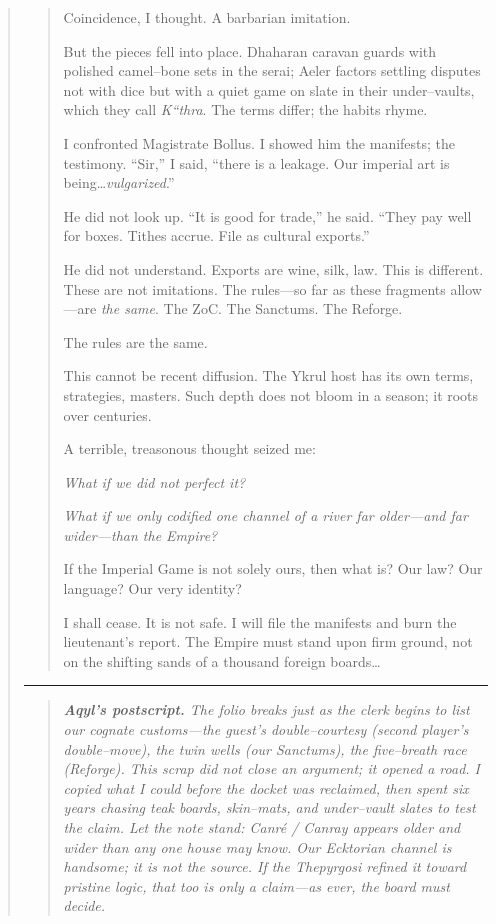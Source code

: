 \documentclass[11pt]{article}
\begin{document}
\begin{quote}
\begin{quote}
\smallskip
\noindent
Coincidence, I thought. A barbarian imitation.

\smallskip
\noindent
But the pieces fell into place. Dhaharan caravan guards with polished camel--bone sets in the serai; Aeler factors settling disputes not with dice but with a quiet game on slate in their under--vaults, which they call \emph{K``thra}. The terms differ; the habits rhyme.

\smallskip
\noindent
I confronted Magistrate Bollus. I showed him the manifests; the testimony. ``Sir,'' I said, ``there is a leakage. Our imperial art is being\ldots \emph{vulgarized}.''

\smallskip
\noindent
He did not look up. ``It is good for trade,'' he said. ``They pay well for boxes. Tithes accrue. File as cultural exports.''

\smallskip
\noindent
He did not understand. Exports are wine, silk, law. This is different. These are not imitations. The rules---so far as these fragments allow---are \emph{the same}. The ZoC. The Sanctums. The Reforge.

\smallskip
\noindent
The rules are the same.

\smallskip
\noindent
This cannot be recent diffusion. The Ykrul host has its own terms, strategies, masters. Such depth does not bloom in a season; it roots over centuries.

\smallskip
\noindent
A terrible, treasonous thought seized me:

\smallskip
\noindent
\emph{What if we did not perfect it?}

\noindent
\emph{What if we only codified one channel of a river far older---and far wider---than the Empire?}

\smallskip
\noindent
If the Imperial Game is not solely ours, then what is? Our law? Our language? Our very identity?

\smallskip
\noindent
I shall cease. It is not safe. I will file the manifests and burn the lieutenant's report. The Empire must stand upon firm ground, not on the shifting sands of a thousand foreign boards\ldots
\end{quote}

\medskip
\noindent\rule{0.82\linewidth}{0.4pt}

\medskip
\medskip
\begin{quote}\small\itshape
\textbf{Aqyl's postscript.} The folio breaks just as the clerk begins to list our cognate customs---the guest's double--courtesy (second player's double--move), the twin wells (our Sanctums), the five--breath race (Reforge). This scrap did not close an argument; it opened a road. I copied what I could before the docket was reclaimed, then spent six years chasing teak boards, skin--mats, and under--vault slates to test the claim. Let the note stand: \emph{Canré / Canray} appears older and wider than any one house may know. Our Ecktorian channel is handsome; it is not the source. If the Thepyrgosi refined it toward pristine logic, that too is only a claim---as ever, the board must decide.
\end{quote}


\end{quote}
\end{document}
